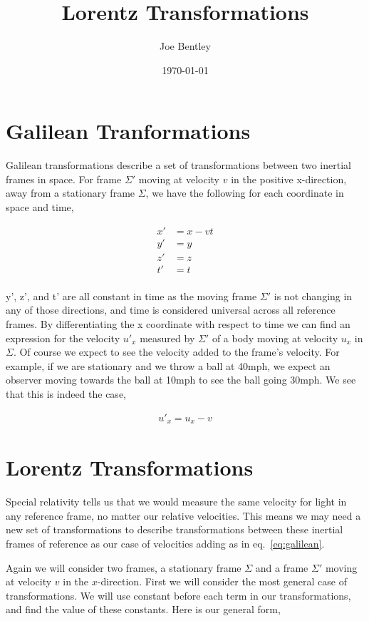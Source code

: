 \documentclass[11pt]{amsart}
\title{Lorentz Transformations}
\author{Joe Bentley}
\date{\today}
\begin{document}
\maketitle

\newpage


\section{Galilean Tranformations}

Galilean transformations describe a set of transformations between two inertial frames in space. For frame $\Sigma'$ moving at velocity $v$ in the positive x-direction, away from a stationary frame $\Sigma$, we have the following for each coordinate in space and time,

\begin{align*}
x' &= x - vt \\
y' &= y \\
z' &= z \\
t' &= t \\
\end{align*}

y', z', and t' are all constant in time as the moving frame $\Sigma'$ is not changing in any of those directions, and time is considered universal across all reference frames. By differentiating the x coordinate with respect to time we can find an expression for the velocity $u'_x$ measured by $\Sigma'$ of a body moving at velocity $u_x$ in $\Sigma$. Of course we expect to see the velocity added to the frame's velocity. For example, if we are stationary and we throw a ball at 40mph, we
expect an observer moving towards the ball at 10mph to see the ball going 30mph. We see that this is indeed the case,

\begin{align}
\label{eq:galilean}
u'_x = u_x - v
\end{align}

\section{Lorentz Transformations}

Special relativity tells us that we would measure the same velocity for light in any reference frame, no matter our relative velocities. This means we may need a new set of transformations to describe transformations between these inertial frames of reference as our case of velocities adding as in eq.~\ref{eq:galilean}.

Again we will consider two frames, a stationary frame $\Sigma$ and a frame $\Sigma'$ moving at velocity $v$ in the $x$-direction. First we will consider the most general case of transformations. We will use constant before each term in our transformations, and find the value of these constants. Here is our general form,
\end{document}
